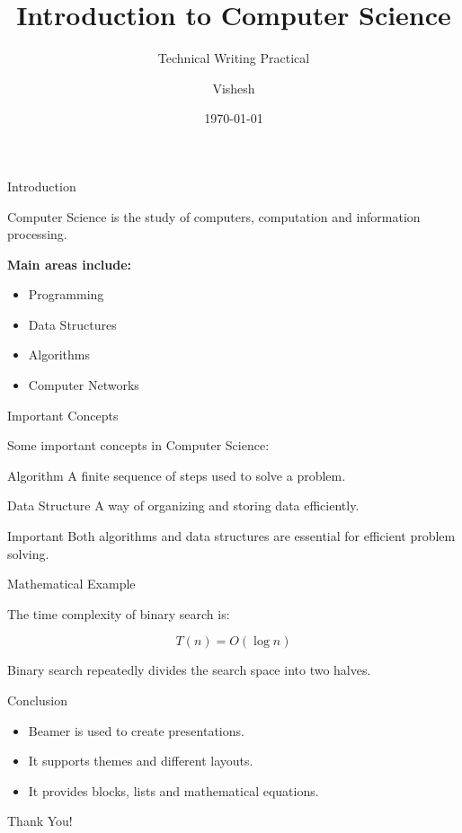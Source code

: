 \documentclass{beamer}
\title{Introduction to Computer Science}
\subtitle{Technical Writing Practical}
\author{Vishesh}
\institute{MNIT Jaipur}
\date{\today}
\begin{document}
\begin{frame}
    \titlepage
\end{frame}

\begin{frame}{Introduction}

Computer Science is the study of computers,
computation and information processing.

\textbf{Main areas include:}

\begin{itemize}
    \item Programming
    \item Data Structures
    \item Algorithms
    \item Computer Networks
\end{itemize}

\end{frame}

\begin{frame}{Important Concepts}

Some important concepts in Computer Science:

\begin{block}{Algorithm}
A finite sequence of steps used to solve a problem.
\end{block}

\begin{block}{Data Structure}
A way of organizing and storing data efficiently.
\end{block}

\begin{alertblock}{Important}
Both algorithms and data structures are essential
for efficient problem solving.
\end{alertblock}

\end{frame}

\begin{frame}{Mathematical Example}

The time complexity of binary search is:

\[
T(n) = O(\log n)
\]

Binary search repeatedly divides the search space
into two halves.

\end{frame}

\begin{frame}{Conclusion}

\begin{itemize}
    \item Beamer is used to create presentations.
    \item It supports themes and different layouts.
    \item It provides blocks, lists and mathematical equations.
\end{itemize}

\vspace{1cm}

\begin{center}
    \Large Thank You!
\end{center}

\end{frame}
\end{document}

